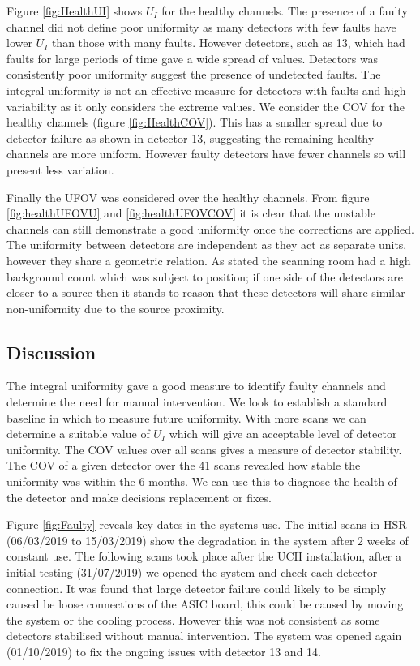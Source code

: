 Figure \ref{fig:HealthUI} shows $U_I$ for the healthy channels. The presence of a faulty channel did not define poor uniformity as many detectors with few faults have lower $U_I$ than those with many faults. However detectors, such as 13, which had faults for large periods of time gave a wide spread of values. Detectors was consistently poor uniformity suggest the presence of undetected faults. 
The integral uniformity is not an effective measure for detectors with faults and high variability as it only considers the extreme values. We consider the \acrshort{COV} for the healthy channels (figure \ref{fig:HealthCOV}). This has a smaller spread due to detector failure as shown in detector 13, suggesting the remaining healthy channels are more uniform. However faulty detectors have fewer channels so will present less variation. 

Finally the \acrshort{UFOV} was considered over the healthy channels. From figure \ref{fig:healthUFOVU} and \ref{fig:healthUFOVCOV} it is clear that the unstable channels can still demonstrate a good uniformity once the corrections are applied. The uniformity between detectors are independent as they act as separate units, however they share a geometric relation. As stated the scanning room had a high background count which was subject to position; if one side of the detectors are closer to a source then it stands to reason that these detectors will share similar non-uniformity due to the source proximity. 

\subsection{Discussion}
The integral uniformity gave a good measure to identify faulty channels and determine the need for manual intervention. We look to establish a standard baseline in which to measure future uniformity. With more scans we can determine a suitable value of $U_I$ which will give an acceptable level of detector uniformity. The \acrshort{COV} values over all scans gives a measure of detector stability. The \acrshort{COV} of a given detector over the 41 scans revealed how stable the uniformity was within the 6 months. We can use this to diagnose the health of the detector and make decisions replacement or fixes. 

Figure \ref{fig:Faulty} reveals key dates in the systems use. The initial scans in \acrshort{HSR} (06/03/2019 to 15/03/2019) show the degradation in the system after 2 weeks of constant use. The following scans took place after the \acrshort{UCH} installation, after a initial testing (31/07/2019) we opened the system and check each detector connection. It was found that large detector failure could likely to be simply caused be loose connections of the ASIC board, this could be caused by moving the system or the cooling process. However this was not consistent as some detectors stabilised without manual intervention. The system was opened again (01/10/2019) to fix the ongoing issues with detector 13 and 14. 

